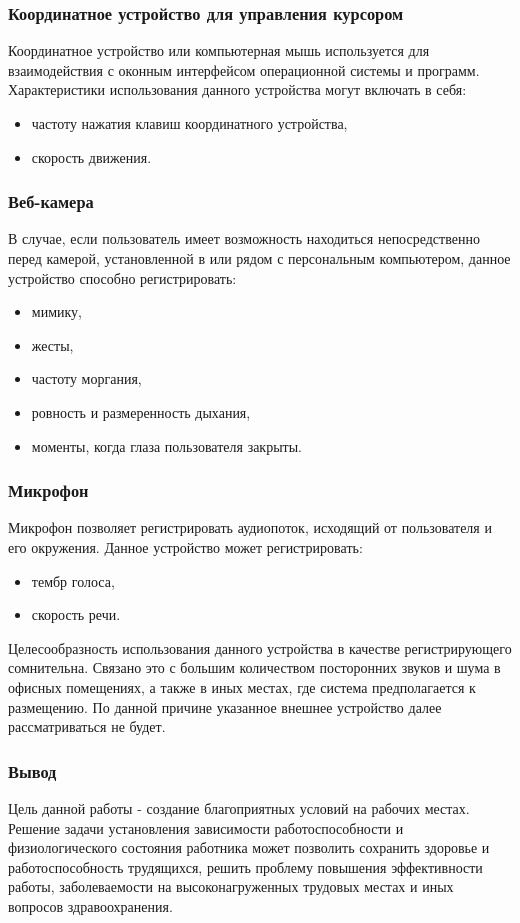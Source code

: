 \subsubsection{Координатное устройство для управления курсором}
Координатное устройство или компьютерная мышь используется для взаимодействия с оконным интерфейсом операционной системы и программ.
Характеристики использования данного устройства могут включать в себя:
\begin{itemize}
\item частоту нажатия клавиш координатного устройства,
\item скорость движения.
\end{itemize}

\subsubsection{Веб-камера}
В случае, если пользователь имеет возможность находиться непосредственно перед камерой, установленной в или рядом с персональным компьютером, данное устройство способно регистрировать:

\begin{itemize}
\item мимику,
\item жесты,
\item частоту моргания,
\item ровность и размеренность дыхания,
\item моменты, когда глаза пользователя закрыты.
\end{itemize}

\subsubsection{Микрофон}
Микрофон позволяет регистрировать аудиопоток, исходящий от пользователя и его окружения. Данное устройство может регистрировать:
\begin{itemize}
\item тембр голоса,
\item скорость речи.
\end{itemize}

Целесообразность использования данного устройства в качестве регистрирующего сомнительна. Связано это с большим количеством посторонних звуков и шума в офисных помещениях, а также в иных местах, где система предполагается к размещению. По данной причине указанное внешнее устройство далее рассматриваться не будет.

\subsubsection*{Вывод}
Цель данной работы - создание благоприятных условий на рабочих местах. Решение задачи установления зависимости работоспособности и физиологического состояния работника может позволить сохранить здоровье и работоспособность трудящихся, решить проблему повышения эффективности работы, заболеваемости на высоконагруженных трудовых местах и иных вопросов здравоохранения.

